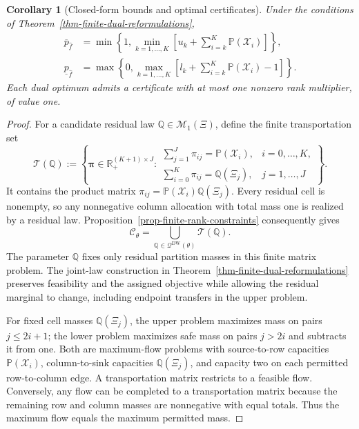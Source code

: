 \documentclass[review,11pt,3p,authoryear,nopreprintline]{elsarticle}
\newtheorem{corollary}{Corollary}
\begin{document}
\begin{corollary}[Closed-form bounds and optimal certificates]
  \label{thm-closed-form-bounds}
  Under the conditions of Theorem~\ref{thm-finite-dual-reformulations},
  \begin{align}
    \overline p_{\hat f}
      &=\min\left\{1,\min_{k=1,\ldots,K}\left[u_k+\sum_{i=k}^{K}\mathbb P(\mathcal X_i)\right]\right\},
      \label{eq-dw-closed-upper}\\
    \underline p_{\hat f}
      &=\max\left\{0,\max_{k=1,\ldots,K}\left[l_k+\sum_{i=k}^{K}\mathbb P(\mathcal X_i)-1\right]\right\}.
      \label{eq-dw-closed-lower}
  \end{align}
  Each dual optimum admits a certificate with at most one nonzero rank multiplier, of value one.
\end{corollary}
\begin{proof}
  For a candidate residual law $\mathbb Q\in\mathcal M_1(\Xi)$, define the finite transportation set
  \[
    \mathcal T(\mathbb Q):=\left\{\bm\pi\in\mathbb R_+^{(K+1)\times J}:
    \begin{array}{ll}
      \displaystyle\sum_{j=1}^{J}\pi_{ij}=\mathbb P(\mathcal X_i),&i=0,\ldots,K,\\[1mm]
      \displaystyle\sum_{i=0}^{K}\pi_{ij}=\mathbb Q(\Xi_j),&j=1,\ldots,J
    \end{array}\right\}.
  \]
  It contains the product matrix $\pi_{ij}=\mathbb P(\mathcal X_i)\mathbb Q(\Xi_j)$. Every residual cell is nonempty, so any nonnegative column allocation with total mass one is realized by a residual law. Proposition~\ref{prop-finite-rank-constraints} consequently gives
  \[
    \mathcal C_\theta
      =\bigcup_{\mathbb Q\in\mathcal Q^{\mathrm{DW}}(\theta)}\mathcal T(\mathbb Q).
  \]
  The parameter $\mathbb Q$ fixes only residual partition masses in this finite matrix problem. The joint-law construction in Theorem~\ref{thm-finite-dual-reformulations} preserves feasibility and the assigned objective while allowing the residual marginal to change, including endpoint transfers in the upper problem.

  For fixed cell masses $\mathbb Q(\Xi_j)$, the upper problem maximizes mass on pairs $j\le2i+1$; the lower problem maximizes safe mass on pairs $j>2i$ and subtracts it from one. Both are maximum-flow problems with source-to-row capacities $\mathbb P(\mathcal X_i)$, column-to-sink capacities $\mathbb Q(\Xi_j)$, and capacity two on each permitted row-to-column edge. A transportation matrix restricts to a feasible flow. Conversely, any flow can be completed to a transportation matrix because the remaining row and column masses are nonnegative with equal totals. Thus the maximum flow equals the maximum permitted mass.


\end{proof}
\end{document}

